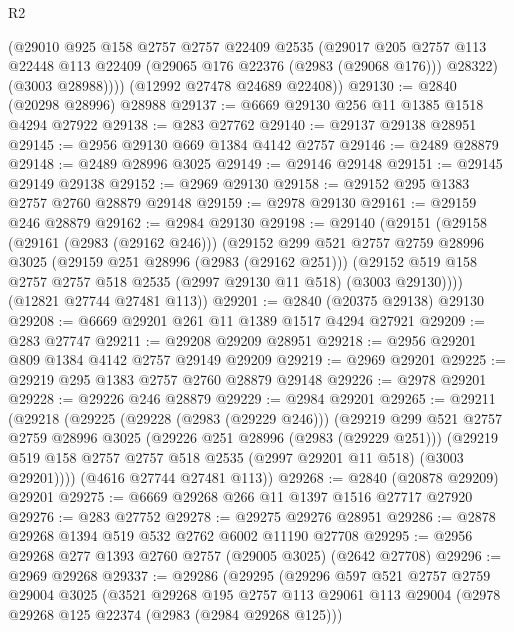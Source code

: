 \begin{lexlean}{R2}
\begin{coremodule}
          (@29010
            @925
            @158
            @2757
            @2757
            @22409
            @2535
            (@29017
              @205
              @2757
              @113
              @22448
              @113
              @22409
              (@29065 @176 @22376 (@2983 (@29068 @176)))
              @28322)
            (@3003 @28988))))
      (@12992 @27478 @24689 @22408))
@29130 := @2840 (@20298 @28996) @28988
@29137 := @6669 @29130 @256 @11 @1385 @1518 @4294 @27922
@29138 := @283 @27762
@29140 := @29137 @29138 @28951
@29145 := @2956 @29130 @669 @1384 @4142 @2757
@29146 := @2489 @28879
@29148 := @2489 @28996 @3025
@29149 := @29146 @29148
@29151 := @29145 @29149 @29138
@29152 := @2969 @29130
@29158 := @29152 @295 @1383 @2757 @2760 @28879 @29148
@29159 := @2978 @29130
@29161 := @29159 @246 @28879
@29162 := @2984 @29130
@29198 := @29140
    (@29151
      (@29158
        (@29161 (@2983 (@29162 @246)))
        (@29152
          @299
          @521
          @2757
          @2759
          @28996
          @3025
          (@29159 @251 @28996 (@2983 (@29162 @251)))
          (@29152 @519 @158 @2757 @2757 @518 @2535 (@2997 @29130 @11 @518) (@3003 @29130))))
      (@12821 @27744 @27481 @113))
@29201 := @2840 (@20375 @29138) @29130
@29208 := @6669 @29201 @261 @11 @1389 @1517 @4294 @27921
@29209 := @283 @27747
@29211 := @29208 @29209 @28951
@29218 := @2956 @29201 @809 @1384 @4142 @2757 @29149 @29209
@29219 := @2969 @29201
@29225 := @29219 @295 @1383 @2757 @2760 @28879 @29148
@29226 := @2978 @29201
@29228 := @29226 @246 @28879
@29229 := @2984 @29201
@29265 := @29211
    (@29218
      (@29225
        (@29228 (@2983 (@29229 @246)))
        (@29219
          @299
          @521
          @2757
          @2759
          @28996
          @3025
          (@29226 @251 @28996 (@2983 (@29229 @251)))
          (@29219 @519 @158 @2757 @2757 @518 @2535 (@2997 @29201 @11 @518) (@3003 @29201))))
      (@4616 @27744 @27481 @113))
@29268 := @2840 (@20878 @29209) @29201
@29275 := @6669 @29268 @266 @11 @1397 @1516 @27717 @27920
@29276 := @283 @27752
@29278 := @29275 @29276 @28951
@29286 := @2878 @29268 @1394 @519 @532 @2762 @6002 @11190 @27708
@29295 := @2956 @29268 @277 @1393 @2760 @2757 (@29005 @3025) (@2642 @27708)
@29296 := @2969 @29268
@29337 := @29286
    (@29295
      (@29296
        @597
        @521
        @2757
        @2759
        @29004
        @3025
        (@3521
          @29268
          @195
          @2757
          @113
          @29061
          @113
          @29004
          (@2978 @29268 @125 @22374 (@2983 (@2984 @29268 @125)))

\end{coremodule}
\end{lexlean}
